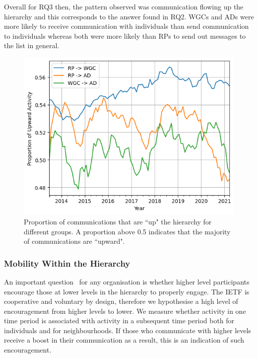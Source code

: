 \documentclass[twocolumn,10pt]{article}
\newlength{\figureWidthOneColumn}
\begin{document}
Overall for RQ3 then, the pattern observed was communication flowing up the
hierarchy and this corresponds to the answer found in RQ2. WGCs and ADs
were more likely to receive communication with individuals than send
communication to individuals whereas both were more likely than RPs to send
out messages to the list in general. 

\begin{figure}[t]
  \centering
  \includegraphics[width=\figureWidthOneColumn]{figures-prev/icwsm-2024/up_hierarchy_communication_ratios.png}
  \caption{
    Proportion of communications that are ``up" the hierarchy for different
    groups. A proportion above 0.5 indicates that the majority of
    communications are ``upward".
  }
  \label{fig:inter_strata}
\end{figure}

\subsubsection{Mobility Within the Hierarchy}
\label{sec:org-dyn:hierarchy:rq4}



An important question~\cite{li2021does,guo2020inclusive} for any
organisation is whether higher level participants encourage those at lower
levels in the hierarchy to properly engage. The IETF is cooperative and
voluntary by design, therefore we hypothesise a high level of encouragement
from higher levels to lower. We measure whether activity in one time period
is associated with activity in a subsequent time period both for
individuals and for neighbourhoods. If those who communicate with higher
levels receive a boost in their communication as a result, this is an
indication of such encouragement.
\end{document}
